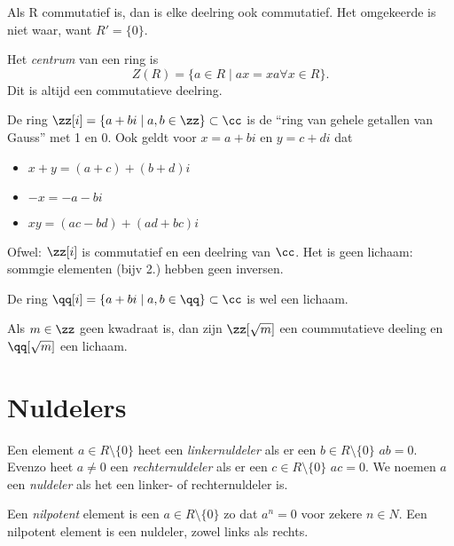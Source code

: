 \documentclass[a4paper,12pt,oneside]{book}
\begin{document}
\begin{opmerking}
Als R commutatief is, dan is elke deelring ook commutatief. Het omgekeerde is niet waar, want $R' = \{0\}$. 
\end{opmerking}
\begin{definitie}
Het \textit{centrum} van een ring is
\[
Z(R) = \{a \in R \mid ax = xa \forall x \in R\}.
\]
Dit is altijd een commutatieve deelring.
\end{definitie}

\begin{voorbeeld}
De ring $\zz[i] = \{a + bi \mid a,b \in \zz\} \subset \cc$ is de ``ring van gehele getallen van Gauss'' met 1 en 0.
Ook geldt voor $x= a + bi$ en $y = c + di$ dat
\begin{itemize}
\item $x + y = (a + c) + (b + d)i$
\item $-x = -a -bi$
\item $xy = (ac -bd) + (ad + bc)i$
\end{itemize}
Ofwel: $\zz[i]$ is commutatief en een deelring van $\cc$. Het is geen lichaam: sommgie elementen (bijv 2.) hebben geen inversen.
\end{voorbeeld}

\begin{voorbeeld}
De ring $\qq[i] = \{a + bi \mid a,b \in \qq\} \subset \cc$ is wel een lichaam.
\end{voorbeeld}

\begin{voorbeeld}
Als $m \in \zz$ geen kwadraat is, dan zijn $\zz[\sqrt{m}]$ een coummutatieve deeling en $\qq[\sqrt{m}]$ een lichaam.
\end{voorbeeld}

\section{Nuldelers}

\begin{definitie}
Een element $a \in R \setminus \{0\}$ heet een \textit{linkernuldeler} als er een $b \in R \setminus \{0\}$
$ab = 0$. Evenzo heet $a \ne 0$ een \textit{rechternuldeler} als er een $c \in R \setminus \{0\}$
$ac = 0$. We noemen $a$ een \textit{nuldeler} als het een linker- of rechternuldeler is.
\end{definitie}

\begin{definitie}
Een \textit{nilpotent} element is een $a \in R \setminus \{0\}$ zo dat $a^n = 0$ voor zekere $n \in N$. Een nilpotent element is een nuldeler, zowel links als rechts.
\end{definitie}
\end{document}

